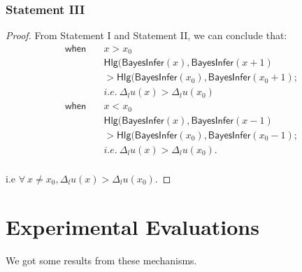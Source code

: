 \documentclass{article}
\begin{document}
\subsubsection{Statement III}
\begin{proof}
From Statement I and Statement II, we can conclude that:
\begin{equation*}
\begin{split}
\mathsf{when} \quad	& x > x_0 \\
					& \mathsf{Hlg}(\mathsf{BayesInfer}(x), \mathsf{BayesInfer}(x + 1) \\
					& > \mathsf{Hlg}(\mathsf{BayesInfer}(x_0), \mathsf{BayesInfer}(x_0 + 1); \\
					& i.e.\ \Delta_l u(x) > \Delta_l u(x_0)\\
\mathsf{when} \quad	& x < x_0 \\
					& \mathsf{Hlg}(\mathsf{BayesInfer}(x), \mathsf{BayesInfer}(x - 1) \\
					& > \mathsf{Hlg}(\mathsf{BayesInfer}(x_0), \mathsf{BayesInfer}(x_0 - 1); \\
					& i.e.\ \Delta_l u(x) > \Delta_l u(x_0).\\
\end{split}
\end{equation*}

i.e $\forall \ x \neq x_0, \Delta_l u(x) > \Delta_l u(x_0)$.

\end{proof}

\section{Experimental Evaluations}
We got some results from these mechanisms.





\end{document}
